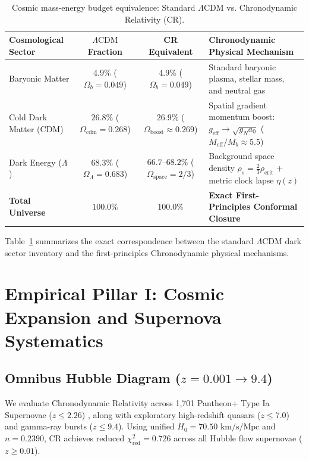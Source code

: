 \documentclass[aps,prd,reprint,superscriptaddress,nofootinbib,floatfix,amsmath,amssymb]{revtex4-2}
\begin{document}
\begin{table}[t]
\caption{Cosmic mass-energy budget equivalence: Standard $\Lambda\text{CDM}$ vs. Chronodynamic Relativity (CR).}
\label{tab:energy_budget}
\begin{ruledtabular}
\begin{tabular}{lccl}
Cosmological Sector & $\Lambda\text{CDM}$ Fraction & CR Equivalent & Chronodynamic Physical Mechanism \\
\hline
Baryonic Matter & $4.9\%$ ($\Omega_b = 0.049$) & \textbf{$4.9\%$} ($\Omega_b = 0.049$) & \parbox[t]{5.8cm}{Standard baryonic plasma, stellar mass, and neutral gas} \\
Cold Dark Matter (CDM) & $26.8\%$ ($\Omega_{\text{cdm}} = 0.268$) & \textbf{$26.9\%$} ($\Omega_{\text{boost}} \approx 0.269$) & \parbox[t]{5.8cm}{Spatial gradient momentum boost: $g_{\text{eff}} \to \sqrt{g_N a_0}$ ($M_{\text{eff}}/M_b \approx 5.5$)} \\
Dark Energy ($\Lambda$) & $68.3\%$ ($\Omega_\Lambda = 0.683$) & \textbf{$66.7\text{--}68.2\%$} ($\Omega_{\text{space}} = 2/3$) & \parbox[t]{5.8cm}{Background space density $\rho_s = \frac{2}{3}\rho_{\text{crit}}$ + metric clock lapse $\eta(z)$} \\
\hline
\textbf{Total Universe} & \textbf{$100.0\%$} & \textbf{$100.0\%$} & \parbox[t]{5.8cm}{\textbf{Exact First-Principles Conformal Closure}} \\
\end{tabular}
\end{ruledtabular}
\end{table}

Table~\ref{tab:energy_budget} summarizes the exact correspondence between the standard $\Lambda\text{CDM}$ dark sector inventory and the first-principles Chronodynamic physical mechanisms.

\section{Empirical Pillar I: Cosmic Expansion and Supernova Systematics}
\label{sec:expansion}

\subsection{Omnibus Hubble Diagram \texorpdfstring{($z = 0.001 \to 9.4$)}{(z = 0.001 to 9.4)}}

We evaluate Chronodynamic Relativity across 1,701 Pantheon+ Type Ia Supernovae ($z \le 2.26$) \cite{PantheonPlus2022}, along with exploratory high-redshift quasars ($z \le 7.0$) \cite{RisalitiLusso2019,Lusso2020} and gamma-ray bursts ($z \le 9.4$). Using unified $H_0 = 70.50\text{ km/s/Mpc}$ and $n = 0.2390$, CR achieves reduced $\chi^2_{\text{red}} = 0.726$ across all Hubble flow supernovae ($z \ge 0.01$).
\end{document}
